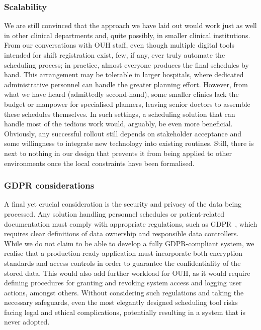\subsubsection*{Scalability}
We are still convinced that the approach we have laid out would work just as well in other clinical departments and, quite possibly, in smaller clinical institutions. From our conversations with OUH staff, even though multiple digital tools intended for shift registration exist, few, if any, ever truly automate the scheduling process; in practice, almost everyone produces the final schedules by hand. This arrangement may be tolerable in larger hospitals, where dedicated administrative personnel can handle the greater planning effort. However, from what we have heard (admittedly second-hand), some smaller clinics lack the budget or manpower for specialised planners, leaving senior doctors to assemble these schedules themselves. In such settings, a scheduling solution that can handle most of the tedious work would, arguably, be even more beneficial. Obviously, any successful rollout still depends on stakeholder acceptance and some willingness to integrate new technology into existing routines. Still, there is next to nothing in our design that prevents it from being applied to other environments once the local constraints have been formalised.

\subsubsection*{GDPR considerations}
A final yet crucial consideration is the security and privacy of the data being processed. Any solution handling personnel schedules or patient-related documentation must comply with appropriate regulations, such as GDPR~\cite{EU-GDPR}, which requires clear definitions of data ownership and responsible data controllers. While we do not claim to be able to develop a fully GDPR-compliant system, we realise that a production-ready application must incorporate both encryption standards and access controls in order to guarantee the confidentiality of the stored data. This would also add further workload for OUH, as it would require defining procedures for granting and revoking system access and logging user actions, amongst others. Without considering such regulations and taking the necessary safeguards, even the most elegantly designed scheduling tool risks facing legal and ethical complications, potentially resulting in a system that is never adopted.
